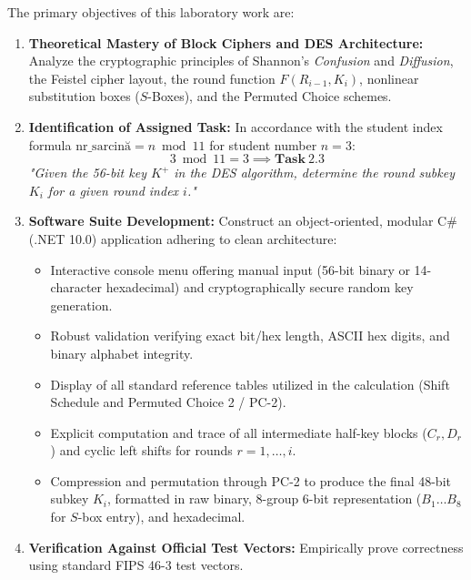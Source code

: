 \documentclass[12pt,a4paper]{article}
\begin{document}
The primary objectives of this laboratory work are:
\begin{enumerate}
    \item \textbf{Theoretical Mastery of Block Ciphers and DES Architecture:} Analyze the cryptographic principles of Shannon's \textit{Confusion} and \textit{Diffusion}, the Feistel cipher layout, the round function $F(R_{i-1}, K_i)$, nonlinear substitution boxes ($S$-Boxes), and the Permuted Choice schemes.
    \item \textbf{Identification of Assigned Task:} In accordance with the student index formula $\text{nr\_sarcină} = n \bmod 11$ for student number $n = 3$:
    \begin{equation}
        3 \bmod 11 = 3 \implies \mathbf{Task\ 2.3}
    \end{equation}
    \textit{"Given the 56-bit key $K^+$ in the DES algorithm, determine the round subkey $K_i$ for a given round index $i$."}
    \item \textbf{Software Suite Development:} Construct an object-oriented, modular C\# (.NET 10.0) application adhering to clean architecture:
    \begin{itemize}
        \item Interactive console menu offering manual input (56-bit binary or 14-character hexadecimal) and cryptographically secure random key generation.
        \item Robust validation verifying exact bit/hex length, ASCII hex digits, and binary alphabet integrity.
        \item Display of all standard reference tables utilized in the calculation (Shift Schedule and Permuted Choice 2 / PC-2).
        \item Explicit computation and trace of all intermediate half-key blocks ($C_r, D_r$) and cyclic left shifts for rounds $r = 1, \dots, i$.
        \item Compression and permutation through PC-2 to produce the final 48-bit subkey $K_i$, formatted in raw binary, 8-group 6-bit representation ($B_1 \dots B_8$ for $S$-box entry), and hexadecimal.
    \end{itemize}
    \item \textbf{Verification Against Official Test Vectors:} Empirically prove correctness using standard FIPS 46-3 test vectors.
\end{enumerate}

\end{document}
